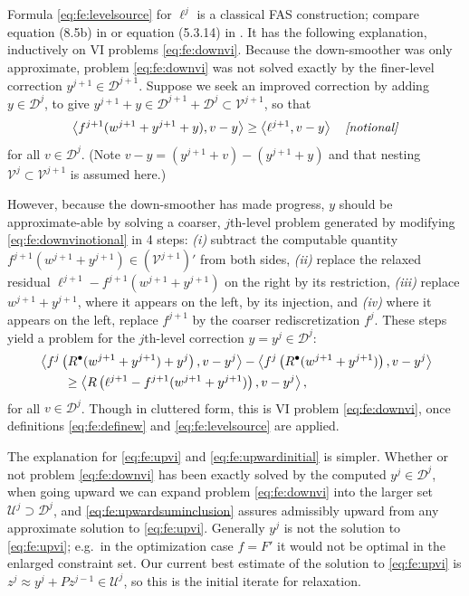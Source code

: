 \documentclass[review,hidelinks,onefignum,onetabnum,final]{siamart220329}  %
\newcommand{\cV}{\mathcal{V}}
\newcommand{\ip}[2]{\left<#1,#2\right>}
\newcommand{\iR}{R^{\bullet}}
\begin{document}
Formula \eqref{eq:fe:levelsource} for $\ell^j$ is a classical FAS construction; compare equation (8.5b) in \cite{BrandtLivne2011} or equation (5.3.14) in \cite{Trottenbergetal2001}.  It has the following explanation, inductively on VI problems \eqref{eq:fe:downvi}.  Because the down-smoother was only approximate, problem \eqref{eq:fe:downvi} was not solved exactly by the finer-level correction $y^{j+1} \in \mathcal{D}^{j+1}$.  Suppose we seek an improved correction by adding $y \in \mathcal{D}^{j}$, to give $y^{j+1}+y \in \mathcal{D}^{j+1}+\mathcal{D}^j \subset \cV^{j+1}$, so that
\begin{equation}
\ip{f^{j+1}(w^{j+1}+y^{j+1}+y)}{v-y} \ge \ip{\ell^{j+1}}{v-y} \quad \text{\emph{[notional]}} \label{eq:fe:downvinotional}
\end{equation}
for all $v \in \mathcal{D}^j$.  (Note $v-y = (y^{j+1}+v)-(y^{j+1}+y)$ and that nesting $\cV^j \subset \cV^{j+1}$ is assumed here.)

However, because the down-smoother has made progress, $y$ should be approximate-able by solving a coarser, $j$th-level problem generated by modifying \eqref{eq:fe:downvinotional} in 4 steps: \emph{(i)} subtract the computable quantity $f^{j+1}(w^{j+1}+y^{j+1}) \in (\mathcal{V}^{j+1})'$ from both sides, \emph{(ii)} replace the relaxed residual $\ell^{j+1}-f^{j+1}(w^{j+1}+y^{j+1})$ on the right by its restriction, \emph{(iii)} replace $w^{j+1}+y^{j+1}$, where it appears on the left, by its injection, and \emph{(iv)} where it appears on the left, replace $f^{j+1}$ by the coarser rediscretization $f^j$.  These steps yield a problem for the $j$th-level correction $y=y^j \in \mathcal{D}^j$:
\begin{align}
&\ip{f^j\left(\iR(w^{j+1}+y^{j+1})+y^j\right)}{v-y^j} - \ip{f^j\left(\iR(w^{j+1}+y^{j+1})\right)}{v-y^j} \label{eq:fe:downvicluttered} \\
&\qquad \ge \ip{R\left(\ell^{j+1}-f^{j+1}(w^{j+1}+y^{j+1})\right)}{v-y^j}, \notag
\end{align}
for all $v\in \mathcal{D}^{j}$.  Though in cluttered form, this is VI problem \eqref{eq:fe:downvi}, once definitions \eqref{eq:fe:definew} and \eqref{eq:fe:levelsource} are applied.

The explanation for \eqref{eq:fe:upvi} and \eqref{eq:fe:upwardinitial} is simpler.  Whether or not problem \eqref{eq:fe:downvi} has been exactly solved by the computed $y^j\in\mathcal{D}^j$, when going upward we can expand problem \eqref{eq:fe:downvi} into the larger set $\mathcal{U}^j \supset \mathcal{D}^j$, and \eqref{eq:fe:upwardsuminclusion} assures admissibly upward from any approximate solution to \eqref{eq:fe:upvi}.  Generally $y^j$ is not the solution to \eqref{eq:fe:upvi}; e.g.~in the optimization case $f=F'$ it would not be optimal in the enlarged constraint set.  Our current best estimate of the solution to \eqref{eq:fe:upvi} is $z^j \approx y^j + Pz^{j-1}\in \mathcal{U}^j$, so this is the initial iterate for relaxation.
\end{document}
